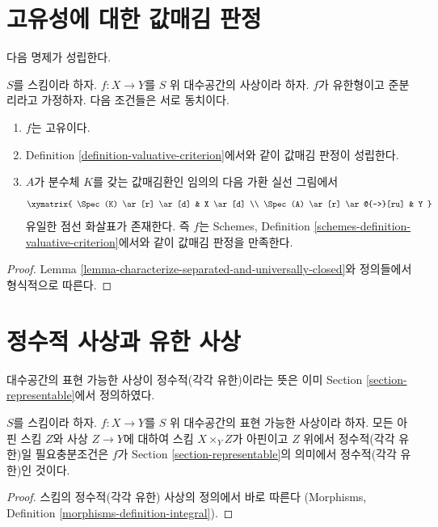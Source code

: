 \section{고유성에 대한 값매김 판정}
\label{section-valuative-criterion-properness}

\noindent
다음 명제가 성립한다.

\begin{lemma}
\label{lemma-characterize-proper}
$S$를 스킴이라 하자. $f : X \to Y$를 $S$ 위 대수공간의 사상이라 하자.
$f$가 유한형이고 준분리라고 가정하자. 다음 조건들은 서로 동치이다.
\begin{enumerate}
\item $f$는 고유이다.
\item Definition \ref{definition-valuative-criterion}에서와 같이 값매김
판정이 성립한다.
\item $A$가 분수체 $K$를 갖는 값매김환인 임의의 다음 가환 실선 그림에서
$$
\xymatrix{
\Spec(K) \ar[r] \ar[d] & X \ar[d] \\
\Spec(A) \ar[r] \ar@{-->}[ru] & Y
}
$$
유일한 점선 화살표가 존재한다. 즉 $f$는 Schemes, Definition
\ref{schemes-definition-valuative-criterion}에서와 같이 값매김 판정을
만족한다.
\end{enumerate}
\end{lemma}

\begin{proof}
Lemma \ref{lemma-characterize-separated-and-universally-closed}와 정의들에서
형식적으로 따른다.
\end{proof}

\section{정수적 사상과 유한 사상}
\label{section-integral}

\noindent
대수공간의 표현 가능한 사상이 정수적(각각 유한)이라는 뜻은 이미
Section \ref{section-representable}에서 정의하였다.

\begin{lemma}
\label{lemma-integral-representable}
$S$를 스킴이라 하자. $f : X \to Y$를 $S$ 위 대수공간의 표현 가능한
사상이라 하자. 모든 아핀 스킴 $Z$와 사상 $Z \to Y$에 대하여 스킴
$X \times_Y Z$가 아핀이고 $Z$ 위에서 정수적(각각 유한)일 필요충분조건은
$f$가 Section \ref{section-representable}의 의미에서 정수적(각각 유한)인
것이다.
\end{lemma}

\begin{proof}
스킴의 정수적(각각 유한) 사상의 정의에서 바로 따른다
(Morphisms, Definition \ref{morphisms-definition-integral}).
\end{proof}


